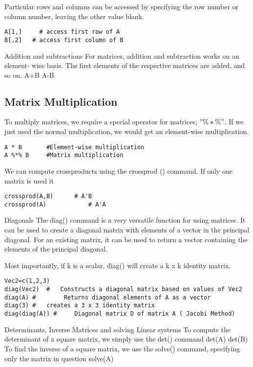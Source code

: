 Particular rows and columns can be accessed by specifying the row number or column number, leaving the other value blank.
\begin{verbatim}
A[1,]	  # access first row of A
B[,2]   # access first column of B
\end{verbatim}
Addition and subtractions
For matrices, addition and subtraction works on an element- wise basis. The first elements of the respective matrices are added, and so on.
A+B
A-B

\subsection{Matrix Multiplication}
To multiply matrices, we require a special operator for matrices; $"\%*\%"$.
If we just used the normal multiplication, we would get an element-wise multiplication.
\begin{verbatim}
A * B  		#Element-wise multiplication
A %*% B  	#Matrix multiplication
\end{verbatim}

We can compute crossproducts using the crossprod () command. If only one matrix is used it
\begin{verbatim}
crossprod(A,B) 		# A'B
crossprod(A) 			# A'A
\end{verbatim}
Diagonals
The diag() command is a very versatile function for using matrices.
It can be used to create a diagonal matrix with elements of a vector in the principal diagonal. For an existing matrix, it can be used to return a vector containing the elements of the principal diagonal.


Most importantly, if k is a scalar, diag() will create a k x k identity matrix.
\begin{verbatim}
Vec2=c(1,2,3)
diag(Vec2)	#	Constructs a diagonal matrix based on values of Vec2
diag(A)	#        Returns diagonal elements of A as a vector
diag(3)	#	creates a 3 x 3 identity matrix
diag(diag(A)) #  	Diagonal matrix D of matrix A ( Jacobi Method)
\end{verbatim}
Determinants, Inverse Matrices and solving Linear systems
To compute the determinant of a square matrix, we simply use the det() command
det(A)
det(B)
To find the inverse of a square matrix, we use the solve() command, specifying only the matrix in question
solve(A)

